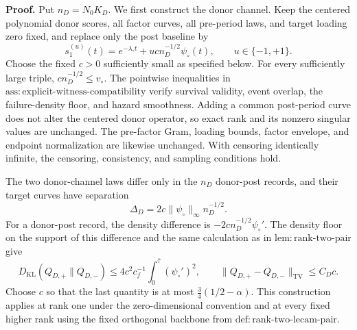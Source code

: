 \textbf{Proof.}
Put \(n_D=N_0K_D\).  We first construct the donor channel.  Keep the
centered polynomial donor scores, all factor curves, all pre-period laws,
and target loading zero fixed, and replace only the post baseline by
\[
 s_1^{(u)}(t)=e^{-\lambda_\circ t}
              +u c n_D^{-1/2}\psi_\circ(t),
 \qquad u\in\{-1,+1\}.                                      \tag{1}
\]
Choose the fixed \(c>0\) sufficiently small as specified below.  For every
sufficiently large triple, \(cn_D^{-1/2}\le v_\circ\).  The pointwise
inequalities in
\(\mathrm{ass:explicit\mbox{-}witness\mbox{-}compatibility}\) verify
survival validity, event overlap, the failure-density floor, and hazard
smoothness.  Adding a common post-period curve does not alter the centered
donor operator, so exact rank and its nonzero singular values are unchanged.
The pre-factor Gram, loading bounds, factor envelope, and endpoint
normalization are likewise unchanged.  With censoring identically infinite,
the censoring, consistency, and sampling conditions hold.

The two donor-channel laws differ only in the \(n_D\) donor-post records,
and their target curves have separation
\[
 \Delta_D=2c\|\psi_\circ\|_\infty n_D^{-1/2}.                \tag{2}
\]
For a donor-post record, the density difference is
\(-2cn_D^{-1/2}\psi_\circ'\).  The density floor on the support of this
difference and the same calculation as in
\(\mathrm{lem:rank\mbox{-}two\mbox{-}pair}\) give
\[
 D_{\mathrm{KL}}(Q_{D,+}\|Q_{D,-})
 \le 4c^2c_f^{-1}\int_0^{\bar\tau}(\psi_\circ')^2,
 \qquad
 \|Q_{D,+}-Q_{D,-}\|_{\mathrm{TV}}\le C_Dc.                 \tag{3}
\]
Choose \(c\) so that the last quantity is at most
\(\frac34(1/2-\alpha)\).  This construction applies at rank one under the
zero-dimensional convention and at every fixed higher rank using the fixed
orthogonal backbone from
\(\mathrm{def:rank\mbox{-}two\mbox{-}lecam\mbox{-}pair}\).


